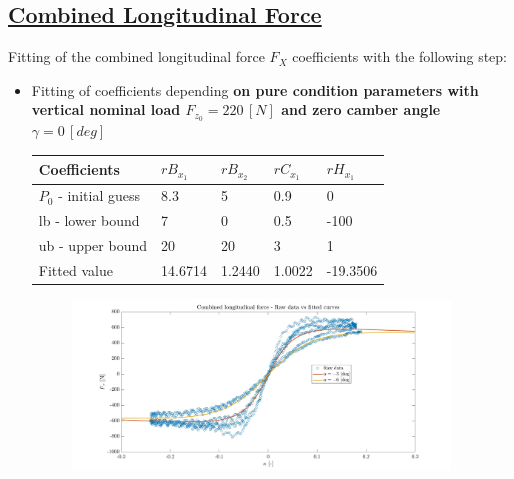 \documentclass{IEEEtran}
\begin{document}
    \subsection{\textbf{\underline{Combined Longitudinal Force}}}
        Fitting of the combined longitudinal force $F_{X}$ coefficients with the
        following step:
        \begin{itemize}
            \item Fitting of coefficients depending \textbf{on pure condition parameters with vertical nominal load $F_{z_0} = 220 \, [N]$ and zero camber angle $\gamma = 0 \, [deg] $} \\
 
                \begin{table}[htbp]
                \begin{center}
                    \begin{tabular}{|l|l|l|l|l|}
                    \hline
                    Coefficients       & $rB_{x_1}$ & $rB_{x_2}$ & $rC_{x_1}$  & $rH_{x_1}$   \\
                    \hline
                    $P_0$ - initial guess & 8.3 & 5 & 0.9 & 0 \\ \hline
                    lb - lower bound   & 7 & 0 & 0.5 & -100 \\ \hline
                    ub - upper bound   & 20 & 20 & 3 & 1 \\ \hline
                    Fitted value        & 14.6714 & 1.2440 & 1.0022& -19.3506 \\ \hline
                    \end{tabular}
                    \end{center}
                \end{table}
                
                \begin{figure}[htbp]
                    \centerline{\includegraphics[width = 3.95in]{combined_longitudinal_1.jpg}}
                   
                    \label{fig:COMB_long_nom}
                \end{figure}
        \end{itemize}
\end{document}
